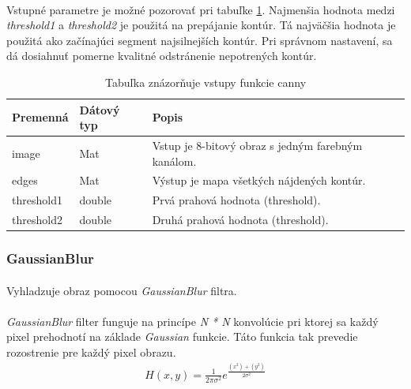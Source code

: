 \documentclass[12pt]{article}
\begin{document}
\paragraph{}
Vstupné parametre je možné pozorovať pri tabuľke \ref{cannyPar}.
Najmenšia hodnota medzi \emph{threshold1} a \emph{threshold2} je použitá na prepájanie kontúr. Tá najväčšia hodnota je použitá ako začínajúci segment najsilnejších kontúr.
Pri správnom nastavení, sa dá dosiahnuť pomerne kvalitné odstránenie nepotrených kontúr.
\cite{OpenCVDoc}
\begin{table}
	\centering
    \begin{tabular}{ | l | l | p{5cm} |}
    \hline
    Premenná & Dátový typ & Popis \\ \hline
    image & Mat & Vstup je 8-bitový obraz s jedným farebným kanálom. \\ \hline
    edges & Mat & Výstup je mapa všetkých nájdených kontúr. \\ \hline
    threshold1 & double & Prvá prahová hodnota (threshold). \\ \hline
    threshold2 & double & Druhá prahová hodnota (threshold). \\
    \hline
    \end{tabular}
  	\caption{Tabuľka znázorňuje vstupy funkcie canny}
  	\label{cannyPar}
\end{table}
\subsubsection{GaussianBlur}
\paragraph{}
Vyhladzuje obraz pomocou \emph{GaussianBlur} filtra.
\cite{OpenCVDoc}
\paragraph{}
\emph{GaussianBlur} filter funguje na princípe \emph{N * N} konvolúcie pri ktorej sa každý pixel prehodnotí na základe \emph{Gaussian} funkcie.
Táto funkcia tak prevedie rozostrenie pre každý pixel obrazu.
\cite{gaussianblur}
\begin{align*}
H(x,y) = \frac{1}{2\pi\sigma^2}e^{\frac{(x^2)+(y^2)}{2\sigma^2}}
\end{align*}
\end{document}
